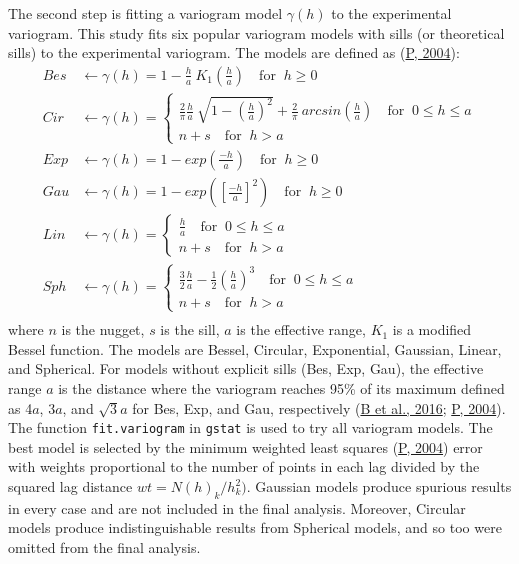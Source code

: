 The second step is fitting a variogram model \(\gamma(h)\) to the experimental variogram. This study fits six popular variogram models with sills (or theoretical sills) to the experimental variogram. The models are defined as (\protect\hyperlink{ref-pebesma2004}{P, 2004}):
\begin{equation}
  \begin{aligned}
    Bes &\leftarrow \gamma(h) = 1 - \frac{h}{a}\ K_1\left(\frac{h}{a}\right) \quad \text{for } \  h \geq 0 \\
    Cir &\leftarrow \gamma(h) =
    \begin{cases}
      \frac{2}{\pi}\frac{h}{a}\ \sqrt{1-\left(\frac{h}{a}\right)^2} + \frac{2}{\pi}\ arcsin\left(\frac{h}{a}\right) \quad \text{for } \  0 \leq h \leq a \\
      n + s \quad \text{for } \  h > a
    \end{cases} \\
    Exp &\leftarrow \gamma(h) = 1 - exp\left(\frac{-h}{a}\right) \quad \text{for } \  h \geq 0 \\
    Gau &\leftarrow \gamma(h) = 1 - exp\left(\left[\frac{-h}{a}\right]^2\right) \quad \text{for } \  h \geq 0 \\
    Lin &\leftarrow \gamma(h) =
    \begin{cases}
      \frac{h}{a} \quad \text{for } \  0 \leq h \leq a \\
      n + s \quad \text{for } \  h > a
    \end{cases} \\
    Sph &\leftarrow \gamma(h) =
    \begin{cases}
      \frac{3}{2}\frac{h}{a} - \frac{1}{2}\left(\frac{h}{a}\right)^3 \quad \text{for } \  0 \leq h \leq a \\
      n + s \quad \text{for } \  h > a
    \end{cases} \\
  \end{aligned}
  \label{eq:varMods}
\end{equation}
where \(n\) is the nugget, \(s\) is the sill, \(a\) is the effective range, \(K_1\) is a modified Bessel function. The models are Bessel, Circular, Exponential, Gaussian, Linear, and Spherical. For models without explicit sills (Bes, Exp, Gau), the effective range \(a\) is the distance where the variogram reaches 95\% of its maximum defined as 4\(a\), 3\(a\), and \(\sqrt{3}a\) for Bes, Exp, and Gau, respectively (\protect\hyperlink{ref-graler2016}{B et al., 2016}; \protect\hyperlink{ref-pebesma2004}{P, 2004}). The function \texttt{fit.variogram} in \texttt{gstat} is used to try all variogram models. The best model is selected by the minimum weighted least squares (\protect\hyperlink{ref-pebesma2004}{P, 2004}) error with weights proportional to the number of points in each lag divided by the squared lag distance \(wt = N(h)_k/h_k^2)\). Gaussian models produce spurious results in every case and are not included in the final analysis. Moreover, Circular models produce indistinguishable results from Spherical models, and so too were omitted from the final analysis.

